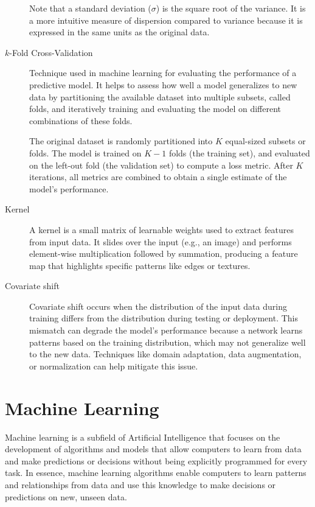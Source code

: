 \documentclass[a4paper]{report}
\begin{document}
\begin{description}
Note that a standard deviation ($\sigma$) is the square root of the variance. It is a more intuitive measure of dispersion compared to variance because it is expressed in the same units as the original data.

\item[$k$-Fold Cross-Validation]
Technique used in machine learning for evaluating the performance of a predictive model. It helps to assess how well a model generalizes to new data by partitioning the available dataset into multiple subsets, called folds, and iteratively training and evaluating the model on different combinations of these folds.

The original dataset is randomly partitioned into $K$ equal-sized subsets or folds. The model is trained on $K-1$ folds (the training set), and evaluated on the left-out fold (the validation set) to compute a loss metric. After $K$ iterations, all metrics are combined to obtain a single estimate of the model's performance.

\item[Kernel]
A kernel is a small matrix of learnable weights used to extract features from input data. It slides over the input (e.g., an image) and performs element-wise multiplication followed by summation, producing a feature map that highlights specific patterns like edges or textures.

\item[Covariate shift]
Covariate shift occurs when the distribution of the input data during training differs from the distribution during testing or deployment. This mismatch can degrade the model's performance because a network learns patterns based on the training distribution, which may not generalize well to the new data. Techniques like domain adaptation, data augmentation, or normalization can help mitigate this issue.

\end{description}

\section{Machine Learning}
Machine learning is a subfield of Artificial Intelligence that focuses on the development of algorithms and models that allow computers to learn from data and make predictions or decisions without being explicitly programmed for every task. In essence, machine learning algorithms enable computers to learn patterns and relationships from data and use this knowledge to make decisions or predictions on new, unseen data.
\end{document}
